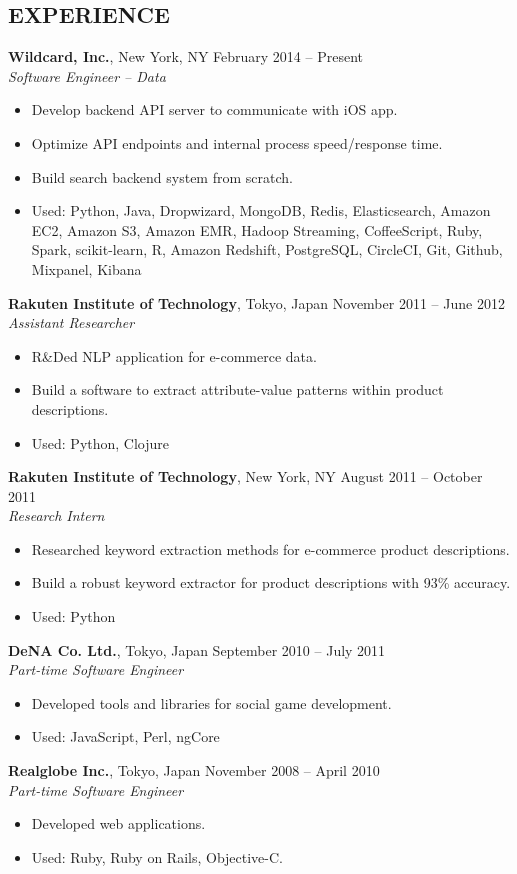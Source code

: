 \documentclass[10pt]{res}
\begin{document}
\begin{resume}
\section{\uppercase{Experience}}
\textbf{Wildcard, Inc.}, New York, NY \hfill February 2014 -- Present\\
\textit{Software Engineer -- Data}\\
\begin{itemize}
    \item Develop backend API server to communicate with iOS app.
    \item Optimize API endpoints and internal process speed/response time.
    \item Build search backend system from scratch.
    \item Used: Python, Java, Dropwizard, MongoDB, Redis, Elasticsearch, Amazon EC2,
Amazon S3, Amazon EMR, Hadoop Streaming, CoffeeScript, Ruby, Spark, scikit-learn,
R, Amazon Redshift, PostgreSQL, CircleCI, Git, Github, Mixpanel, Kibana \\
\end{itemize}
\textbf{Rakuten Institute of Technology}, Tokyo, Japan \hfill November 2011 -- June 2012\\
\textit{Assistant Researcher}
\begin{itemize}
  \item R\&Ded NLP application for e-commerce data.
  \item Build a software to extract attribute-value patterns within product descriptions.
  \item Used: Python, Clojure
\end{itemize}
\textbf{Rakuten Institute of Technology}, New York, NY \hfill August 2011 -- October 2011\\
\textit{Research Intern}
\begin{itemize}
  \item Researched keyword extraction methods for e-commerce product descriptions.
  \item Build a robust keyword extractor for product descriptions with 93\% accuracy.
  \item Used: Python
\end{itemize}
\textbf{DeNA Co. Ltd.}, Tokyo, Japan \hfill September 2010 -- July 2011\\
\textit{Part-time Software Engineer}
\begin{itemize}
  \item Developed tools and libraries for social game development.
  \item Used: JavaScript, Perl, ngCore
\end{itemize}
\textbf{Realglobe Inc.}, Tokyo, Japan \hfill November 2008 -- April 2010\\
\textit{Part-time Software Engineer}
\begin{itemize}
  \item Developed web applications.
  \item Used: Ruby, Ruby on Rails, Objective-C.
\end{itemize}


\end{resume}
\end{document}
